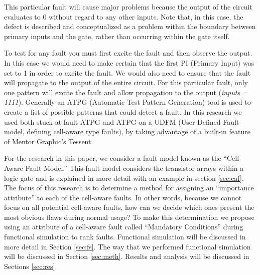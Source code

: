     This particular fault will cause major problems because the output of the circuit evaluates to 0 without regard to any other inputs. 
    Note that, in this case, the defect is described and conceptualized as a problem within the boundary between primary inputs and the gate, rather than occurring within the gate itself.


    To test for any fault you must first excite the fault and then observe the output.
    In this case we would need to make certain that the first PI (Primary Input) was set to 1 in order to excite the fault.
    We would also need to ensure that the fault will propagate to the output of the entire circuit. 
    For this particular fault, only one pattern will excite the fault and allow propagation to the output (\textit{inputs = 1111}). 
    Generally an ATPG (Automatic Test Pattern Generation) tool is used to create a list of possible patterns that could detect a fault.
    In this research we used both stuck-at fault ATPG and ATPG on a UDFM (User Defined Fault model, defining cell-aware type faults), by taking advantage of a built-in feature of Mentor Graphic's Tessent. 

    For the research in this paper, we consider a fault model known as the ``Cell-Aware Fault Model.''
    This fault model considers the transistor arrays within a logic gate and is explained in more detail with an example in section \ref{sec:caf}.
    The focus of this research is to determine a method for assigning an ``importance attribute'' to each of the cell-aware faults. 
    In other words, because we cannot focus on all potential cell-aware faults, how can we decide which ones present the most obvious flaws during normal usage? 
    To make this determination we propose using an attribute of a cell-aware fault called ``Mandatory Conditions'' during functional simulation to rank faults. 
    Functional simulation will be discussed in more detail in Section \ref{sec:fs}.
    The way that we performed functional simulation will be discussed in Section \ref{sec:meth}.
    Results and analysis will be discussed in Sections \ref{sec:res}.

